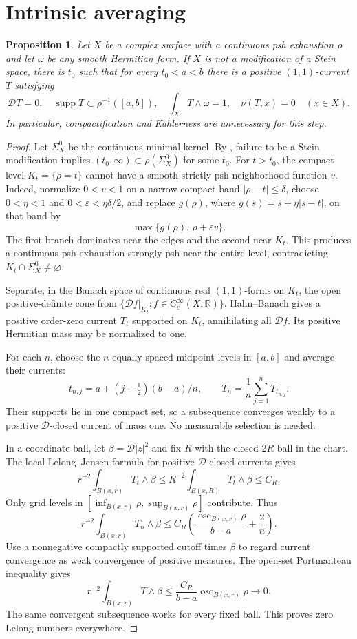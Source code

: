 \documentclass[11pt]{article}
\newtheorem{proposition}[theorem]{Proposition}
\theoremstyle{remark}
\newcommand{\D}{\mathcal D}
\newcommand{\supp}{\operatorname{supp}}
\newcommand{\osc}{\operatorname{osc}}
\begin{document}
\section{Intrinsic averaging}
\begin{proposition}\label{prop:averaging}
Let $X$ be a complex surface with a continuous psh exhaustion $\rho$ and let $\omega$ be any smooth Hermitian form. If $X$ is not a modification of a Stein space, there is $t_0$ such that for every $t_0<a<b$ there is a positive $(1,1)$-current $T$ satisfying
\[
 \D T=0,\quad \supp T\subset\rho^{-1}([a,b]),\quad
 \int_XT\wedge\omega=1,\quad \nu(T,x)=0\quad(x\in X).
\]
In particular, compactification and K\"ahlerness are unnecessary for this step.
\end{proposition}
\begin{proof}
Let $\Sigma_X^0$ be the continuous minimal kernel. By \cite[Lemma~2.1]{MS}, failure to be a Stein modification implies
$(t_0,\infty)\subset\rho(\Sigma_X^0)$ for some $t_0$.
For $t>t_0$, the compact level $K_t=\{\rho=t\}$ cannot have a smooth strictly psh neighborhood function $v$. Indeed, normalize $0<v<1$ on a narrow compact band $|\rho-t|\le\delta$, choose $0<\eta<1$ and $0<\varepsilon<\eta\delta/2$, and replace
$g(\rho)$, where $g(s)=s+\eta|s-t|$, on that band by
\[
 \max\{g(\rho),\,\rho+\varepsilon v\}.
\]
The first branch dominates near the edges and the second near $K_t$.
This produces a continuous psh exhaustion strongly psh near the entire level, contradicting $K_t\cap\Sigma_X^0\ne\varnothing$.

Separate, in the Banach space of continuous real $(1,1)$-forms on $K_t$, the open positive-definite cone from
$\{\D f|_{K_t}:f\in C_c^\infty(X,\mathbb R)\}$.
Hahn--Banach gives a positive order-zero current $T_t$ supported on $K_t$, annihilating all $\D f$. Its positive Hermitian mass may be normalized to one.

For each $n$, choose the $n$ equally spaced midpoint levels in $[a,b]$ and average their currents:
\[
 t_{n,j}=a+(j-\tfrac12)(b-a)/n,\qquad
 T_n=\frac1n\sum_{j=1}^nT_{t_{n,j}}.
\]
Their supports lie in one compact set, so a subsequence converges weakly to a positive $\D$-closed current of mass one. No measurable selection is needed.

In a coordinate ball, let $\beta=\D|z|^2$ and fix $R$ with the closed $2R$ ball in the chart. The local Lelong--Jensen formula for positive $\D$-closed currents \cite[Appendix~B]{DNS} gives
\[
 r^{-2}\int_{B(x,r)}T_t\wedge\beta
 \le R^{-2}\int_{B(x,R)}T_t\wedge\beta\le C_R.
\]
Only grid levels in
$[\inf_{B(x,r)}\rho,\sup_{B(x,r)}\rho]$ contribute. Thus
\[
 r^{-2}\int_{B(x,r)}T_n\wedge\beta
 \le C_R\left(\frac{\osc_{B(x,r)}\rho}{b-a}+\frac2n\right).
\]
Use a nonnegative compactly supported cutoff times $\beta$ to regard current convergence as weak convergence of positive measures. The open-set Portmanteau inequality gives
\[
 r^{-2}\int_{B(x,r)}T\wedge\beta
 \le\frac{C_R}{b-a}\osc_{B(x,r)}\rho\longrightarrow0.
\]
The same convergent subsequence works for every fixed ball. This proves zero Lelong numbers everywhere.
\end{proof}
\end{document}
